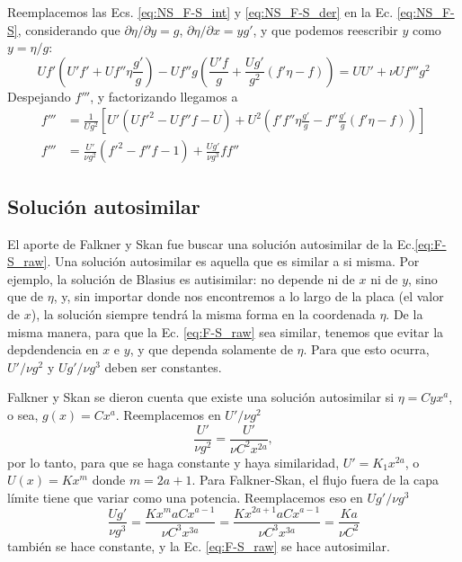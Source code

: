 Reemplacemos las Ecs. \eqref{eq:NS_F-S_int} y \eqref{eq:NS_F-S_der} en la Ec. \eqref{eq:NS_F-S}, considerando que $\partial\eta/\partial y=g$, $\partial\eta/\partial x = yg'$, y que podemos reescribir $y$ como $y=\eta/g$:
%
\begin{equation}
Uf'(U'f'+Uf''\eta\frac{g'}{g})-Uf''g\left(\frac{U'f}{g}+\frac{Ug'}{g^2}(f'\eta-f)\right) = UU'+\nu Uf'''g^2
\end{equation}
%
Despejando $f'''$, y factorizando llegamos a
%
\begin{align}\label{eq:F-S_raw}
f'''&=\frac{1}{Ug^2}\left[U'(Uf'^2-Uf''f-U)+U^2\left(f'f''\eta\frac{g'}{g} - f''\frac{g'}{g}(f'\eta-f)\right)\right] \nonumber\\
f'''&=\frac{U'}{\nu g^2}(f'^2-f''f-1)+\frac{Ug'}{\nu g^3}ff''
\end{align}

\subsection*{Solución autosimilar}
El aporte de Falkner y Skan fue buscar una solución autosimilar de la Ec.\eqref{eq:F-S_raw}.
Una solución autosimilar es aquella que es similar a si misma.
Por ejemplo, la solución de Blasius es autisimilar: no depende ni de $x$ ni de $y$, sino que de $\eta$, y, sin importar donde nos encontremos a lo largo de la placa (el valor de $x$), la solución siempre tendrá la misma forma en la coordenada $\eta$.
De la misma manera, para que la Ec. \eqref{eq:F-S_raw} sea similar, tenemos que evitar la depdendencia en $x$ e $y$, y que dependa solamente de $\eta$.
Para que esto ocurra, $U'/\nu g^2$ y $Ug'/\nu g^3$ deben ser constantes.

Falkner y Skan se dieron cuenta que existe una solución autosimilar si $\eta=Cyx^a$, o sea, $g(x)=Cx^a$. 
Reemplacemos en $U'/\nu g^2$
%
\begin{equation}
\frac{U'}{\nu g^2} = \frac{U'}{\nu C^2x^{2a}},
\end{equation}
%
por lo tanto, para que se haga constante y haya similaridad, $U'=K_1x^{2a}$, o $U(x)=Kx^m$ donde $m=2a+1$.
Para Falkner-Skan, el flujo fuera de la capa límite tiene que variar como una potencia.
Reemplacemos eso en $Ug'/\nu g^3$
%
\begin{equation}
\frac{Ug'}{\nu g^3}=\frac{Kx^maCx^{a-1}}{\nu C^3x^{3a}} = \frac{Kx^{2a+1}aCx^{a-1}}{\nu C^3x^{3a}} = \frac{Ka}{\nu C^2}
\end{equation}
%
también se hace constante, y la Ec. \eqref{eq:F-S_raw} se hace autosimilar.

